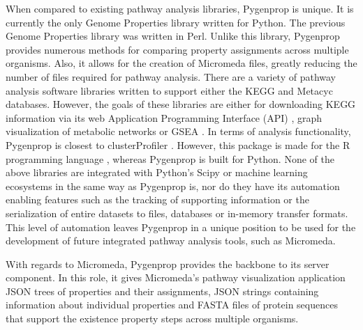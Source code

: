 When compared to existing pathway analysis libraries, Pygenprop is unique. It is currently the only Genome Properties library written for Python. The previous Genome Properties library was written in Perl. Unlike this library, Pygenprop provides numerous methods for comparing property assignments across multiple organisms. Also, it allows for the creation of Micromeda files, greatly reducing the number of files required for pathway analysis. There are a variety of pathway analysis software libraries written to support either the KEGG \cite{zhang2009kegggraph,posma2013metabonetworks,yu2012clusterprofiler,cock2009biopython} and Metacyc \cite{international} databases. However, the goals of these libraries are either for downloading KEGG information via its web Application Programming Interface (API) \cite{cock2009biopython}, graph visualization of metabolic networks \cite{posma2013metabonetworks} or GSEA \cite{yu2012clusterprofiler}. In terms of analysis functionality, Pygenprop is closest to clusterProfiler \cite{yu2012clusterprofiler}. However, this package is made for the R programming language \cite{rprogman}, whereas Pygenprop is built for Python. None of the above libraries are integrated with Python's Scipy \cite{scipystack} or machine learning ecosystems in the same way as Pygenprop is, nor do they have its automation enabling features such as the tracking of supporting information or the serialization of entire datasets to files, databases or in-memory transfer formats. This level of automation leaves Pygenprop in a unique position to be used for the development of future integrated pathway analysis tools, such as Micromeda.

With regards to Micromeda, Pygenprop provides the backbone to its server component. In this role, it gives Micromeda's pathway visualization application JSON trees of properties and their assignments, JSON strings containing information about individual properties and FASTA files of protein sequences that support the existence property steps across multiple organisms.
